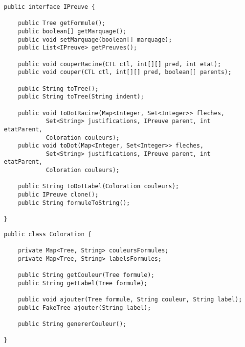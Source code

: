 \documentclass[dvipsnames]{report}
\begin{document}
\newpage

\begin{lstlisting}[caption={Interface \psverb+IPreuve+ commune à toutes les preuves}, label={lst:IPreuve}]
public interface IPreuve {

	public Tree getFormule();
	public boolean[] getMarquage();
	public void setMarquage(boolean[] marquage);
	public List<IPreuve> getPreuves();

	public void couperRacine(CTL ctl, int[][] pred, int etat);
	public void couper(CTL ctl, int[][] pred, boolean[] parents);

	public String toTree();
	public String toTree(String indent);

	public void toDotRacine(Map<Integer, Set<Integer>> fleches,
			Set<String> justifications, IPreuve parent, int etatParent,
			Coloration couleurs);
	public void toDot(Map<Integer, Set<Integer>> fleches,
			Set<String> justifications, IPreuve parent, int etatParent,
			Coloration couleurs);

	public String toDotLabel(Coloration couleurs);
	public IPreuve clone();
	public String formuleToString();

}
\end{lstlisting}

\begin{lstlisting}[caption={Classe \psverb+Coloration+}, label={lst:Coloration}]
public class Coloration {

	private Map<Tree, String> couleursFormules;
	private Map<Tree, String> labelsFormules;

	public String getCouleur(Tree formule);
	public String getLabel(Tree formule);

	public void ajouter(Tree formule, String couleur, String label);
	public FakeTree ajouter(String label);

	public String genererCouleur();

}
\end{lstlisting}
\end{document}
